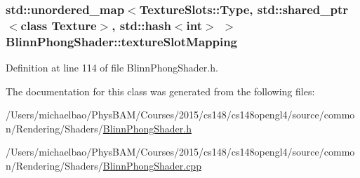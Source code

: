 \subsubsection[{texture\+Slot\+Mapping}]{\setlength{\rightskip}{0pt plus 5cm}std\+::unordered\+\_\+map$<${\bf Texture\+Slots\+::\+Type}, std\+::shared\+\_\+ptr$<$class {\bf Texture}$>$, std\+::hash$<$int$>$ $>$ Blinn\+Phong\+Shader\+::texture\+Slot\+Mapping\hspace{0.3cm}{\ttfamily [private]}}\label{class_blinn_phong_shader_a7467b1de2650fd04ea63ed5f8aeedc59}


Definition at line 114 of file Blinn\+Phong\+Shader.\+h.



The documentation for this class was generated from the following files\+:\begin{DoxyCompactItemize}
\item 
/\+Users/michaelbao/\+Phys\+B\+A\+M/\+Courses/2015/cs148/cs148opengl4/source/common/\+Rendering/\+Shaders/\hyperlink{_blinn_phong_shader_8h}{Blinn\+Phong\+Shader.\+h}\item 
/\+Users/michaelbao/\+Phys\+B\+A\+M/\+Courses/2015/cs148/cs148opengl4/source/common/\+Rendering/\+Shaders/\hyperlink{_blinn_phong_shader_8cpp}{Blinn\+Phong\+Shader.\+cpp}\end{DoxyCompactItemize}
